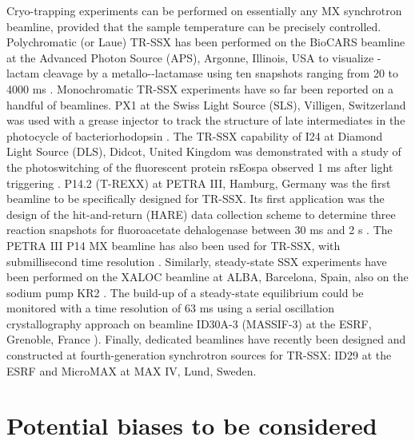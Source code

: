 Cryo-trapping experiments can be performed on essentially any MX synchrotron beamline, provided that the sample temperature can be precisely controlled. Polychromatic (or Laue) TR-SSX has been performed on the BioCARS beamline at the Advanced Photon Source (APS), Argonne, Illinois, USA to visualize \textBeta-lactam cleavage by a metallo-\textBeta-lactamase using ten snapshots ranging from 20 to 4000 ms \parencite{wilamowskiTimeresolvedVlactamCleavage2022}. Monochromatic TR-SSX experiments have so far been reported on a handful of beamlines. PX1 at the Swiss Light Source (SLS), Villigen, Switzerland was used with a grease injector to track the structure of late intermediates in the photocycle of bacteriorhodopsin \parencite{weinertProtonUptakeMechanism2019}. The TR-SSX capability of I24 at Diamond Light Source (DLS), Didcot, United Kingdom was demonstrated with a study of the photoswitching of the fluorescent protein rsEospa observed 1 ms after light triggering \parencite{baxterObservationCationChromophore2022}. P14.2 (T-REXX) at PETRA III, Hamburg, Germany was the first beamline to be specifically designed for TR-SSX. Its first application was the design of the hit-and-return (HARE) data collection scheme to determine three reaction snapshots for fluoroacetate dehalogenase between 30 ms and 2 s \parencite{schulzHitandreturnSystemEnables2018}. The PETRA III P14 MX beamline has also been used for TR-SSX, with submillisecond time resolution \parencite{kovalevMechanismsInwardTransmembrane2023}. Similarly, steady-state SSX experiments have been performed on the XALOC beamline at ALBA, Barcelona, Spain, also on the sodium pump KR2 \parencite{kovalevMolecularMechanismLightdriven2020}. The build-up of a steady-state equilibrium could be monitored with a time resolution of 63 ms using a serial oscillation crystallography approach on beamline ID30A-3 (MASSIF-3) at the ESRF, Grenoble, France \parencite{aumonierMillisecondTimeresolvedSerial2020}). Finally, dedicated beamlines have recently been designed and constructed at fourth-generation synchrotron sources for TR-SSX: ID29 at the ESRF and MicroMAX at MAX IV, Lund, Sweden.

\section{Potential biases to be considered}\label{sec:potentialbias}
